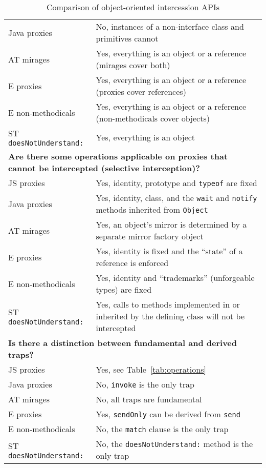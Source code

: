 \documentclass{acm_proc_article-sp}
\begin{document}
\begin{table*}
\begin{tabular}{|p{}|p{}|}
    Java proxies      & No, instances of a non-interface class and primitives cannot\\
    AT mirages        & Yes, everything is an object or a reference (mirages cover both)\\
    E proxies         & Yes, everything is an object or a reference (proxies cover references)\\
    E non-methodicals & Yes, everything is an object or a reference (non-methodicals cover objects)\\
    ST \texttt{doesNotUnderstand:}  & Yes, everything is an object\\
    \hline
    \multicolumn{2}{|l|}{\textbf{Are there some operations applicable on proxies that cannot be intercepted (selective interception)?}}\\
    \hline
    JS proxies        & Yes, identity, prototype and \texttt{typeof} are fixed\\
    Java proxies      & Yes, identity, class, and the \texttt{wait} and \texttt{notify} methods inherited from \texttt{Object}\\
    AT mirages        & Yes, an object's mirror is determined by a separate mirror factory object\\
    E proxies         & Yes, identity is fixed and the ``state'' of a reference is enforced\\
    E non-methodicals & Yes, identity and ``trademarks'' (unforgeable types) are fixed\\
    ST \texttt{doesNotUnderstand:}  & Yes, calls to methods implemented in or inherited by the defining class will not be intercepted\\
    \hline
    \multicolumn{2}{|l|}{\textbf{Is there a distinction between fundamental and derived traps?}}\\
    \hline
    JS proxies        & Yes, see Table~\ref{tab:operations}\\
    Java proxies      & No, \texttt{invoke} is the only trap\\
    AT mirages        & No, all traps are fundamental\\
    E proxies         & Yes, \texttt{sendOnly} can be derived from \texttt{send}\\
    E non-methodicals & No, the \texttt{match} clause is the only trap\\
    ST \texttt{doesNotUnderstand:}  & No, the \texttt{doesNotUnderstand:} method is the only trap\\
    \hline
  \end{tabular}
  \caption{Comparison of object-oriented intercession APIs}
  \label{tab:related_work}
\end{table*}
\end{document}
